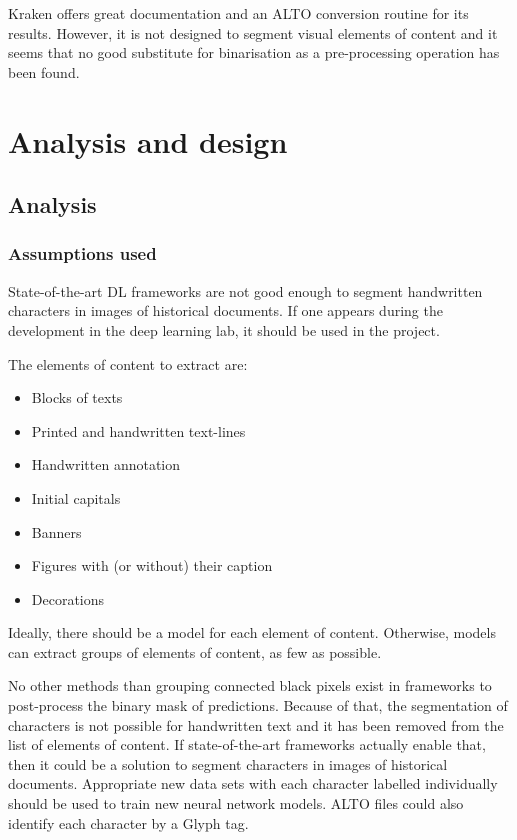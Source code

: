 \documentclass{polytech/polytech}
\numberwithin{figure}{chapter}
\begin{document}
Kraken offers great documentation and an ALTO conversion routine for its results.
However, it is not designed to segment visual elements of content and it seems that no good substitute for binarisation as a pre-processing operation has been found.



\chapter{Analysis and design}

\section{Analysis}


\subsection{Assumptions used}

State-of-the-art DL frameworks are not good enough to segment handwritten characters in images of historical documents.
If one appears during the development in the deep learning lab, it should be used in the project.

The elements of content to extract are:
\begin{itemize}
\item Blocks of texts
\item Printed and handwritten text-lines
\item Handwritten annotation
\item Initial capitals
\item Banners
\item Figures with (or without) their caption
\item Decorations
\end{itemize}
Ideally, there should be a model for each element of content.
Otherwise, models can extract groups of elements of content, as few as possible.

No other methods than grouping connected black pixels exist in frameworks to post-process the binary mask of predictions.
Because of that, the segmentation of characters is not possible for handwritten text and it has been removed from the list of elements of content.
If state-of-the-art frameworks actually enable that, then it could be a solution to segment characters in images of historical documents.
Appropriate new data sets with each character labelled individually should be used to train new neural network models.
ALTO files could also identify each character by a Glyph tag.
\end{document}
